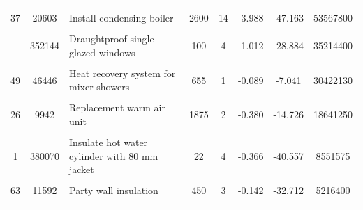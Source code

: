 \begin{table}[!h]
{\begin{tabular}[t]{cc p{6cm} ccccc}
\cellcolor{gray!10}{50} & \cellcolor{gray!10}{96199} & \cellcolor{gray!10}{Flue gas heat recovery device in conjunction with boiler} & \cellcolor{gray!10}{650} & \cellcolor{gray!10}{4} & \cellcolor{gray!10}{0.562} & \cellcolor{gray!10}{-42.050} & \cellcolor{gray!10}{62529350}\\
37 & 20603 & Install condensing boiler & 2600 & 14 & -3.988 & -47.163 & 53567800\\
\cellcolor{gray!10}{56} & \cellcolor{gray!10}{36168} & \cellcolor{gray!10}{Replacement glazing units} & \cellcolor{gray!10}{1200} & \cellcolor{gray!10}{1} & \cellcolor{gray!10}{-0.146} & \cellcolor{gray!10}{-16.667} & \cellcolor{gray!10}{43401600}\\
\addlinespace
10 & 352144 & Draughtproof single-glazed windows & 100 & 4 & -1.012 & -28.884 & 35214400\\
\cellcolor{gray!10}{22} & \cellcolor{gray!10}{3147} & \cellcolor{gray!10}{Replace boiler with biomass boiler} & \cellcolor{gray!10}{10000} & \cellcolor{gray!10}{15} & \cellcolor{gray!10}{-11.784} & \cellcolor{gray!10}{-106.260} & \cellcolor{gray!10}{31470000}\\
49 & 46446 & Heat recovery system for mixer showers & 655 & 1 & -0.089 & -7.041 & 30422130\\
\cellcolor{gray!10}{35} & \cellcolor{gray!10}{751259} & \cellcolor{gray!10}{Low energy lighting for all fixed outlets} & \cellcolor{gray!10}{30} & \cellcolor{gray!10}{1} & \cellcolor{gray!10}{-0.108} & \cellcolor{gray!10}{-5.385} & \cellcolor{gray!10}{22838274}\\
26 & 9942 & Replacement warm air unit & 1875 & 2 & -0.380 & -14.726 & 18641250\\
\addlinespace
\cellcolor{gray!10}{43} & \cellcolor{gray!10}{1064} & \cellcolor{gray!10}{Condensing oil boiler with radiators} & \cellcolor{gray!10}{12500} & \cellcolor{gray!10}{10} & \cellcolor{gray!10}{-2.715} & \cellcolor{gray!10}{-18.210} & \cellcolor{gray!10}{13300000}\\
1 & 380070 & Insulate hot water cylinder with 80 mm jacket & 22 & 4 & -0.366 & -40.557 & 8551575\\
\cellcolor{gray!10}{9} & \cellcolor{gray!10}{6800} & \cellcolor{gray!10}{Secondary glazing to single glazed windows} & \cellcolor{gray!10}{1250} & \cellcolor{gray!10}{2} & \cellcolor{gray!10}{-0.661} & \cellcolor{gray!10}{-12.716} & \cellcolor{gray!10}{8500000}\\
63 & 11592 & Party wall insulation & 450 & 3 & -0.142 & -32.712 & 5216400\\
\cellcolor{gray!10}{36} & \cellcolor{gray!10}{411} & \cellcolor{gray!10}{Replace heating unit with condensing unit} & \cellcolor{gray!10}{2600} & \cellcolor{gray!10}{3} & \cellcolor{gray!10}{-0.396} & \cellcolor{gray!10}{-22.771} & \cellcolor{gray!10}{1068600}\\
\bottomrule
\end{tabular}}
\end{table}